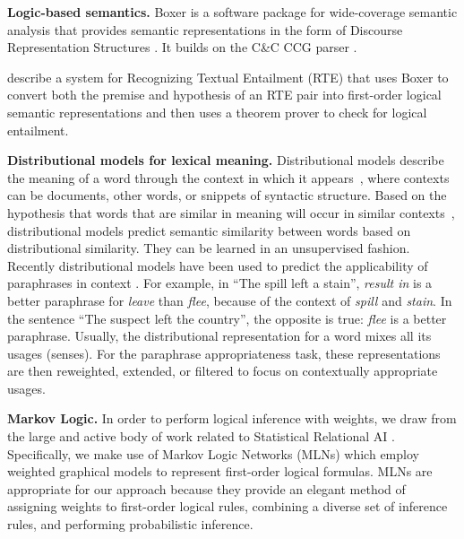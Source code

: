 \textbf{Logic-based semantics.}
Boxer \citep{bos:coling2004} is a software package for wide-coverage semantic
analysis that provides semantic representations in the form of Discourse
Representation Structures \citep{kamp:book93}. It builds on the C\&C CCG parser
\citep{clark:acl04}.

\citet{bos:emnlp2005} describe a system for Recognizing Textual Entailment
(RTE) that uses Boxer to convert both the premise and hypothesis of an RTE pair
into first-order logical semantic representations and then uses a theorem prover
to check for logical entailment. 


\noindent\textbf{Distributional models for lexical meaning.} Distributional
models describe the meaning of a word through the context in which it
appears~\citep{landauer97:solution,lund96:producing}, where contexts can be
documents, other words, or snippets of syntactic structure. Based on
the hypothesis that words that are similar in meaning will occur in
similar contexts~\citep{harris:wj1954,firth:slaj1957}, distributional
models predict semantic similarity between words based on
distributional similarity. They can be learned in an unsupervised fashion.
Recently distributional models have been used to predict the applicability of
paraphrases in context \citep{erk:emnlp2008,thater:acl2010,reisinger:naacl2010,dinu:emnlp2010,vandecruys:emnlp2011}.
For example, in ``The spill left a stain'', {\it result in} is a better
paraphrase for {\it leave} than {\it flee}, because of the context of {\it spill}
and {\it stain}.  In the sentence ``The suspect left the country'', the
opposite is true: {\it flee} is a better paraphrase. Usually, the distributional
representation for a word mixes all its usages (senses). For the paraphrase
appropriateness task, these representations are then reweighted, extended, or
filtered to focus on contextually appropriate usages.

\noindent\textbf{Markov Logic.} 
In order to perform logical inference with weights, we draw
from the large and active body of work related to Statistical Relational AI
\citep{getoor:book2007}.  Specifically, we make use of Markov Logic Networks
(MLNs) \citep{richardson:mlj06} which employ weighted graphical models to
represent first-order logical formulas. MLNs are appropriate for our approach
because they provide an elegant method of assigning weights to first-order
logical rules, combining a diverse set of inference rules, and performing
probabilistic inference.

